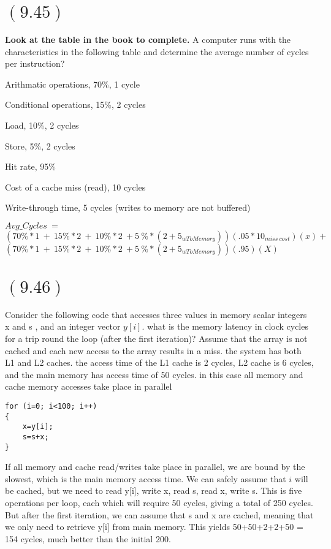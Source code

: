 \documentclass[letterpaper,12pt,titlepage]{article}
\begin{document}
\newpage
\section*{$(9.45)$} \textbf{Look at the table in the book to complete.} A computer runs with the characteristics in the following table and determine the average number of cycles per instruction?

Arithmatic operations, 70\%, 1 cycle

 
Conditional operations, 15\%, 2 cycles


Load, 10\%, 2 cycles


Store, 5\%, 2 cycles


Hit rate, 95\%


Cost of a cache miss (read), 10 cycles

Write-through time, 5 cycles (writes to memory are not buffered)

\begin{mdframed}[style=MyFrame]
$Avg\_Cycles~=~$\\
$(70\%*1~+~15\%*2~+~10\%*2~+5~\%*(2+5_{wToMemory}))(.05*10_{miss~cost})(x)+$\\
              $(70\%*1~+~15\%*2~+~10\%*2~+5~\%*(2+5_{wToMemory}))(.95)(X)$

\end{mdframed}

\section*{$(9.46)$} Consider the following code that accesses three values in memory scalar integers x and s , and an integer vector $y[i]$. what is the memory latency in clock cycles for a trip round the loop (after the first iteration)? Assume that the array is not cached and each new access to the array results in a miss.
the system has both L1 and L2 caches. the access time of the L1 cache is 2 cycles, L2 cache is 6 cycles, and the main memory has access time of 50 cycles. in this case all memory and cache memory accesses take place in parallel
\begin{verbatim} 
for (i=0; i<100; i++)
{
    x=y[i];
    s=s+x;
}
\end{verbatim}

\begin{mdframed}[style=MyFrame]
If all memory and cache read/writes take place in parallel, we are bound by the slowest, which is the main memory access time. We can safely assume that $i$ will be cached, but we need to read y[i], write x, read s, read x, write s. This is five operations per loop, each which will require 50 cycles, giving a total of 250 cycles. But after the first iteration, we can assume that s and x are cached, meaning that we only need to retrieve y[i] from main memory. This yields 50+50+2+2+50 = 154 cycles, much better than the initial 200. 
\end{mdframed}
\end{document}
